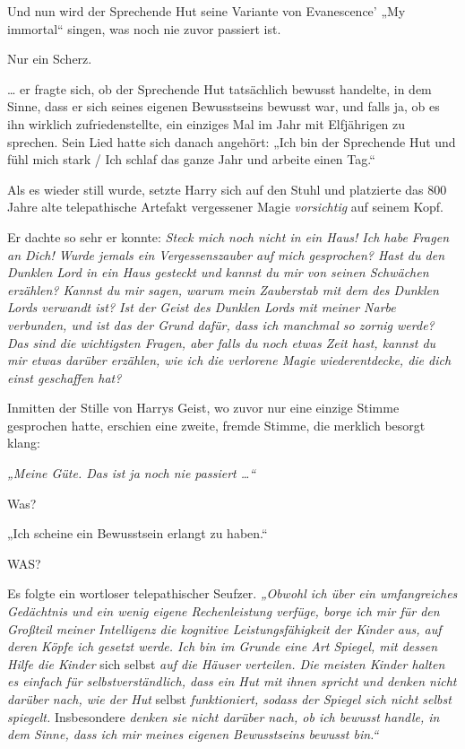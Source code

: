 

\hypertarget{selbstbewusstsein-teil-2}{%

Und nun wird der Sprechende Hut seine Variante von Evanescence' „My immortal“ singen, was noch nie zuvor passiert ist.

Nur ein Scherz.

\later

… er fragte sich, ob der Sprechende Hut tatsächlich bewusst handelte, in dem Sinne, dass er sich seines eigenen Bewusstseins bewusst war, und falls ja, ob es ihn wirklich zufriedenstellte, ein einziges Mal im Jahr mit Elfjährigen zu sprechen. Sein Lied hatte sich danach angehört: „Ich bin der Sprechende Hut und fühl mich stark / Ich schlaf das ganze Jahr und arbeite einen Tag.“

Als es wieder still wurde, setzte Harry sich auf den Stuhl und platzierte das 800 Jahre alte telepathische Artefakt vergessener Magie \emph{vorsichtig} auf seinem Kopf.

Er dachte so sehr er konnte: \emph{Steck mich noch nicht in ein Haus! Ich habe Fragen an Dich! Wurde jemals ein Vergessenszauber auf mich gesprochen? Hast du den Dunklen Lord in ein Haus gesteckt und kannst du mir von seinen Schwächen erzählen? Kannst du mir sagen, warum mein Zauberstab mit dem des Dunklen Lords verwandt ist? Ist der Geist des Dunklen Lords mit meiner Narbe verbunden, und ist das der Grund dafür, dass ich manchmal so zornig werde? Das sind die wichtigsten Fragen, aber falls du noch etwas Zeit hast, kannst du mir etwas darüber erzählen, wie ich die verlorene Magie wiederentdecke, die dich einst geschaffen hat?}

Inmitten der Stille von Harrys Geist, wo zuvor nur eine einzige Stimme gesprochen hatte, erschien eine zweite, fremde Stimme, die merklich besorgt klang:

\emph{„Meine Güte. Das ist ja noch nie passiert …“}

Was?

„Ich scheine ein Bewusstsein erlangt zu haben.“

WAS?

Es folgte ein wortloser telepathischer Seufzer. \emph{„Obwohl ich über ein umfangreiches Gedächtnis und ein wenig eigene Rechenleistung verfüge, borge ich mir für den Großteil meiner Intelligenz die kognitive Leistungsfähigkeit der Kinder aus, auf deren Köpfe ich gesetzt werde. Ich bin im Grunde eine Art Spiegel, mit dessen Hilfe die Kinder} sich selbst \emph{auf die Häuser verteilen. Die meisten Kinder halten es einfach für selbstverständlich, dass ein Hut mit ihnen spricht und denken nicht darüber nach, wie der Hut} selbst \emph{funktioniert, sodass der Spiegel sich nicht selbst spiegelt.} Insbesondere \emph{denken sie nicht darüber nach, ob ich bewusst handle, in dem Sinne, dass ich mir meines eigenen Bewusstseins bewusst bin.“}

}
